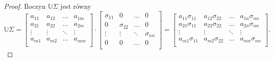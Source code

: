 \documentclass[12pt,a4paper]{report}
\begin{document}
\begin{proof}
Iloczyn $\mathbb{U} \Sigma$ jest równy
$$\mathbb{U} \Sigma = \left[
        \begin{array}{cccc}
         a_{11} & a_{12} & \ldots & a_{1m} \\
         a_{21} & a_{22} & \ldots & a_{2m} \\
         \vdots & \vdots & \ddots & \vdots \\
         a_{m1} & a_{m2} & \ldots & a_{mm} \\
         \end{array}
      \right] \cdot \left[
        \begin{array}{cccc}
         \sigma_{11} & 0 & \ldots & 0 \\
         0 & \sigma_{22} & \ldots & 0 \\
         \vdots & \vdots & \ddots & \sigma_{nn} \\
         0 & 0 & \ldots & 0 \\
         \end{array}
      \right] = \left[
        \begin{array}{cccc}
         a_{11} \sigma_{11} & a_{12} \sigma_{22} & \ldots & a_{1n} \sigma_{nn} \\
         a_{21} \sigma_{11} & a_{22} \sigma_{22} & \ldots & a_{2n} \sigma_{nn}\\
         \vdots & \vdots & \ddots & \vdots \\
         a_{m1} \sigma_{11} & a_{m2} \sigma_{22} & \ldots & a_{mn} \sigma_{nn} \\
         \end{array}
      \right].$$
      

\end{proof}
\end{document}
